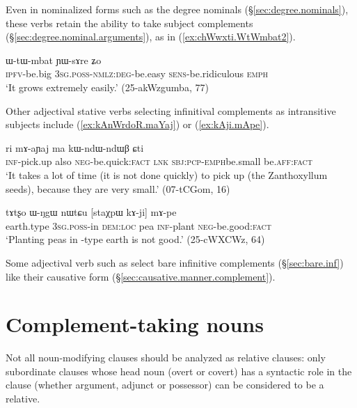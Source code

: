 Even in nominalized forms such as the degree nominals (§\ref{sec:degree.nominals}), these verbs retain the ability to take subject complements (§\ref{sec:degree.nominal.arguments}), as in (\ref{ex:chWwxti.WtWmbat2}).

\begin{exe}
\ex \label{ex:chWwxti.WtWmbat2}
 ɯ-tɯ-mbat ɲɯ-sɤre ʑo  \\
\textsc{ipfv}-be.big \textsc{3sg}.\textsc{poss}-\textsc{nmlz}:\textsc{deg}-be.easy \textsc{sens}-be.ridiculous \textsc{emph} \\
\glt `It grows extremely easily.' (25-akWzgumba, 77)
\end{exe}

Other adjectival stative verbs selecting infinitival complements as intransitive subjects include  (\ref{ex:kAnWrdoR.maYaj}) or  (\ref{ex:kAji.mApe}).

\begin{exe}
\ex \label{ex:kAnWrdoR.maYaj}
\gll [kɤ-nɯrdoʁ] ri mɤ-aɲaj ma kɯ-ndɯ-ndɯβ ɕti \\
\textsc{inf}-pick.up also \textsc{neg}-be.quick:\textsc{fact} \textsc{lnk} \textsc{sbj}:\textsc{pcp}-\textsc{emph}\redp{}be.small be.\textsc{aff}:\textsc{fact} \\
\glt `It takes a lot of time (it is not done quickly) to pick up (the Zanthoxyllum seeds), because they are very small.' (07-tCGom, 16)
\end{exe}

 \begin{exe}
\ex \label{ex:kAji.mApe}
\gll tɤtʂo ɯ-ŋgɯ nɯtɕu [staχpɯ kɤ-ji] mɤ-pe \\
earth.type \textsc{3sg}.\textsc{poss}-in \textsc{dem}:\textsc{loc} pea \textsc{inf}-plant \textsc{neg}-be.good:\textsc{fact} \\
\glt `Planting peas in -type earth is not good.' (25-cWXCWz, 64)
\end{exe}


Some adjectival verb such as  select bare infinitive complements (§\ref{sec:bare.inf}) like their causative form (§\ref{sec:causative.manner.complement}).



  \section{Complement-taking nouns} \label{sec:complement.taking.nouns}
 Not all noun-modifying clauses should be analyzed as relative clauses: only subordinate clauses whose head noun (overt or covert) has a syntactic role in the clause (whether argument, adjunct or possessor) can be considered to be a relative.


